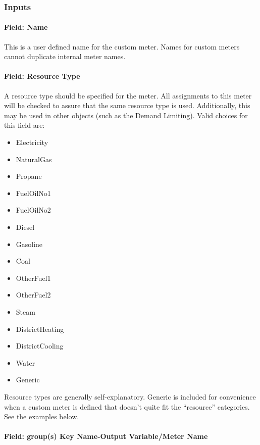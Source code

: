 \subsubsection{Inputs}\label{inputs-17-008}

\paragraph{Field: Name}\label{field-name-043}

This is a user defined name for the custom meter. Names for custom meters cannot duplicate internal meter names.

\paragraph{Field: Resource Type}\label{field-fuel-type-004}

A resource type should be specified for the meter. All assignments to this meter will be checked to assure that the same resource type is used. Additionally, this may be used in other objects (such as the Demand Limiting). Valid choices for this field are:

\begin{itemize}
\item
  Electricity
\item
  NaturalGas
\item
  Propane
\item
  FuelOilNo1
\item
  FuelOilNo2
\item
  Diesel
\item
  Gasoline
\item
  Coal
\item
  OtherFuel1
\item
  OtherFuel2
\item
  Steam
\item
  DistrictHeating
\item
  DistrictCooling
\item
  Water
\item
  Generic
\end{itemize}

Resource types are generally self-explanatory. Generic is included for convenience when a custom meter is defined that doesn't quite fit the ``resource'' categories. See the examples below.

\paragraph{Field: group(s) Key Name-Output Variable/Meter Name}\label{field-groups-key-name-output-variablemeter-name}

